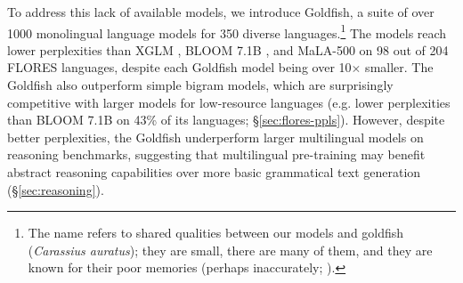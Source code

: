 \documentclass[11pt]{article}
\begin{document}
To address this lack of available models, we introduce Goldfish, a suite of over 1000 monolingual language models for 350 diverse languages.\footnote{The name refers to shared qualities between our models and goldfish (\textit{Carassius auratus}); they are small, there are many of them, and they are known for their poor memories (perhaps inaccurately; \citealp{carey-2024-goldfish}).
}
The models reach lower perplexities than XGLM \citep{lin2022xglm}, BLOOM 7.1B \citep{bigscience-bloom}, and MaLA-500 \citep{lin-2024-mala500} on 98 out of 204 FLORES languages, despite each Goldfish model being over 10$\times$ smaller.
The Goldfish also outperform simple bigram models, which are surprisingly competitive with larger models for low-resource languages (e.g. lower perplexities than BLOOM 7.1B on 43\% of its languages; \S\ref{sec:flores-ppls}).
However, despite better perplexities, the Goldfish underperform larger multilingual models on reasoning benchmarks, suggesting that multilingual pre-training may benefit abstract reasoning capabilities over more basic grammatical text generation (\S\ref{sec:reasoning}).
\end{document}
